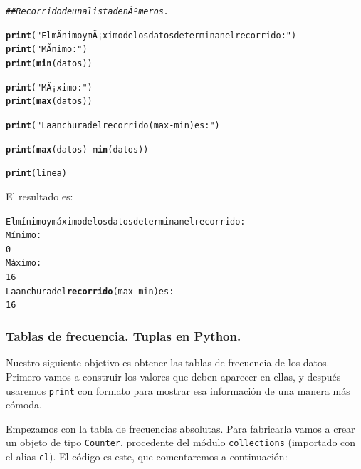 \documentclass[10pt,a4paper]{article}\usepackage[]{graphicx}\usepackage[]{color}
\makeatletter
\newcommand{\hlstr}[1]{\textcolor[rgb]{0.192,0.494,0.8}{#1}}%
\newcommand{\hlcom}[1]{\textcolor[rgb]{0.678,0.584,0.686}{\textit{#1}}}%
\newcommand{\hlopt}[1]{\textcolor[rgb]{0,0,0}{#1}}%
\newcommand{\hlstd}[1]{\textcolor[rgb]{0.345,0.345,0.345}{#1}}%
\newcommand{\hlkwd}[1]{\textcolor[rgb]{0.737,0.353,0.396}{\textbf{#1}}}%
\newenvironment{kframe}{%
 \def\at@end@of@kframe{}%
 \ifinner\ifhmode%
  \def\at@end@of@kframe{\end{minipage}}%
  \begin{minipage}{\columnwidth}%
 \fi\fi%
 \def\FrameCommand##1{\hskip\@totalleftmargin \hskip-\fboxsep
 \colorbox{shadecolor}{##1}\hskip-\fboxsep
     \hskip-\linewidth \hskip-\@totalleftmargin \hskip\columnwidth}%
 \MakeFramed {\advance\hsize-\width
   \@totalleftmargin\z@ \linewidth\hsize
   \@setminipage}}%
 {\par\unskip\endMakeFramed%
 \at@end@of@kframe}
\newenvironment{knitrout}{}{} %
\newcounter {cont01}
\makeatother
\begin{document}
\begin{knitrout}
\color{fgcolor}\begin{kframe}
\begin{alltt}
\hlcom{## Recorrido de una lista de nÃºmeros.  }

\hlkwd{print}\hlstd{(}\hlstr{"El mÃ­nimo y mÃ¡ximo de los datos determinan el recorrido:"}\hlstd{)}
\hlkwd{print}\hlstd{(}\hlstr{"MÃ­nimo:"}\hlstd{)}
\hlkwd{print}\hlstd{(}\hlkwd{min}\hlstd{(datos))}

\hlkwd{print}\hlstd{(}\hlstr{"MÃ¡ximo:"}\hlstd{)}
\hlkwd{print}\hlstd{(}\hlkwd{max}\hlstd{(datos))}

\hlkwd{print}\hlstd{(}\hlstr{"La anchura del recorrido (max - min) es:"}\hlstd{)}

\hlkwd{print}\hlstd{(}\hlkwd{max}\hlstd{(datos)} \hlopt{-} \hlkwd{min}\hlstd{(datos))}

\hlkwd{print}\hlstd{(linea)}
\end{alltt}
\end{kframe}
\end{knitrout}

El resultado es:
\begin{knitrout}
\color{fgcolor}\begin{kframe}
\begin{alltt}
El mínimo y máximo de los datos determinan el recorrido:
Mínimo:
0
Máximo:
16
La anchura del \hlkwd{recorrido} (max - min) es:
16
\end{alltt}
\end{kframe}
\end{knitrout}

\subsubsection*{Tablas de frecuencia. Tuplas en Python.}
\label{tut02:subsubsec:tablasFrecuenciaTuplas}

Nuestro siguiente objetivo es obtener las tablas de frecuencia de los datos. Primero vamos a construir los valores que deben aparecer en ellas, y después usaremos {\tt print} con formato para mostrar esa información de una manera más cómoda.

Empezamos con la tabla de frecuencias absolutas. Para fabricarla vamos a crear un objeto  de tipo {\tt Counter}, procedente del módulo {\tt collections} (importado con el alias {\tt cl}). El código es este, que comentaremos a continuación:
\end{document}
